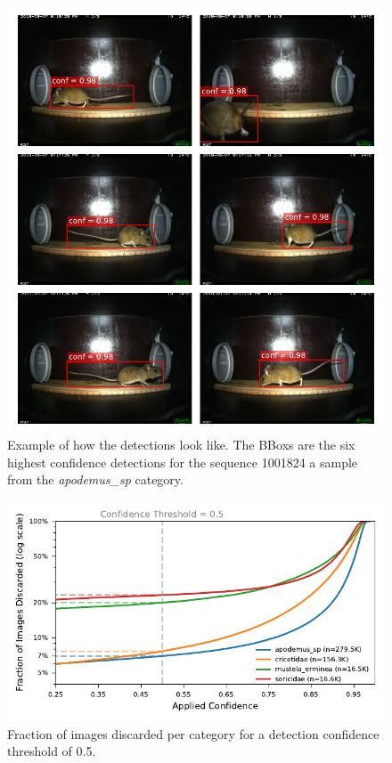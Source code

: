         \begin{figure}[p]
        \centering
        \includegraphics{figures/detections_on_a_sequence.pdf}
        \caption{Example of how the detections look like. The \acsp{BBox} are the six highest confidence detections for the sequence 1001824 a sample from the \textit{apodemus\_sp} category.}
        \label{fig:detection_example}
        \end{figure}

        \begin{figure}[ht]
        \centering
        \includegraphics{figures/discarded_img_by_conf.pdf}
        \caption{Fraction of images discarded per category for a detection confidence threshold of 0.5.}
        \label{fig:lost_images}
        \end{figure}        

